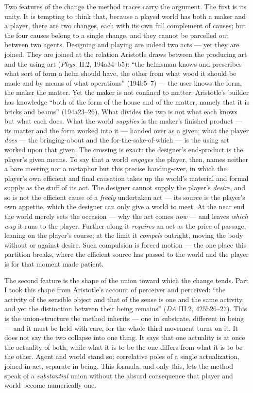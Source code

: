 \documentclass{article}
\begin{document}
Two features of the change the method traces carry the argument. The first is its unity. It is tempting to think that, because a played world has both a maker and a player, there are two changes, each with its own full complement of causes; but the four causes belong to a single change, and they cannot be parcelled out between two agents. Designing and playing are indeed two acts — yet they are joined. They are joined at the relation Aristotle draws between the producing art and the using art (\textit{Phys.} II.2, 194a34–b5): ``the helmsman knows and prescribes what sort of form a helm should have, the other from what wood it should be made and by means of what operations'' (194b5–7) — the user knows the form, the maker the matter. Yet the maker is not confined to matter: Aristotle's builder has knowledge ``both of the form of the house and of the matter, namely that it is bricks and beams'' (194a23–26). What divides the two is not what each knows but what each does. What the world \textit{supplies} is the maker's finished product — its matter and the form worked into it — handed over as a given; what the player \textit{does} — the bringing-about and the for-the-sake-of-which — is the using art worked upon that given. The crossing is exact: the designer's end-product is the player's given means. To say that a world \textit{engages} the player, then, names neither a bare meeting nor a metaphor but this precise handing-over, in which the player's own efficient and final causation takes up the world's material and formal supply as the stuff of its act. The designer cannot supply the player's \textit{desire}, and so is not the efficient cause of a \textit{freely} undertaken act — its source is the player's own appetite, which the designer can only give a world to meet. At the near end the world merely sets the occasion — why the act comes \textit{now} — and leaves \textit{which way} it runs to the player. Further along it \textit{requires} an act as the price of passage, leaning on the player's course; at the limit it \textit{compels} outright, moving the body without or against desire. Such compulsion is forced motion — the one place this partition breaks, where the efficient source has passed to the world and the player is for that moment made patient.

The second feature is the shape of the union toward which the change tends. Part I took this shape from Aristotle's account of perceiver and perceived: ``the activity of the sensible object and that of the sense is one and the same activity, and yet the distinction between their being remains'' (\textit{DA} III.2, 425b26–27). This is the union-structure the method inherits — one in substrate, different in being — and it must be held with care, for the whole third movement turns on it. It does not say the two collapse into one thing. It says that one actuality is at once the actuality of both, while what it is to be the one differs from what it is to be the other. Agent and world stand so: correlative poles of a single actualization, joined in act, separate in being. This formula, and only this, lets the method speak of a \textit{substantial} union without the absurd consequence that player and world become numerically one.
\end{document}
